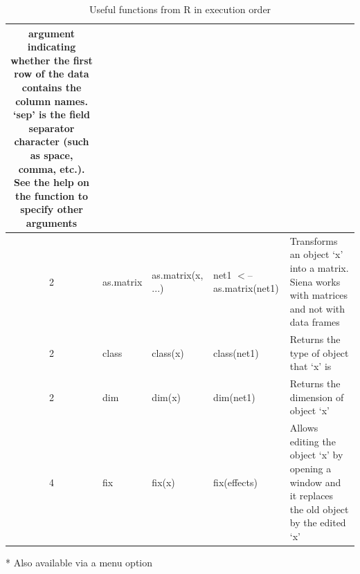 \documentclass[a4paper,fleqn,11pt]{article}
\newcommand{\+}{\, + \,}
\newcommand{\R}{{\sf R }}
\begin{document}
\begin{table}
\begin{threeparttable}
\begin{small}
\begin{tabular}{c | l | p{3cm} | p{3cm} | p{12cm} }
argument indicating whether the first row of the data contains the column
names. `sep' is the field separator character
 (such as space, comma, etc.). See the help on the function to specify
other arguments\\
\hline 2 &  as.matrix   &as.matrix(x, ...)   &net1 $<$-- \newline as.matrix(net1) &
Transforms an object `x' into a matrix. Siena works with matrices and
not with data frames\\
\hline 2&  class &   class(x)  & class(net1)  & Returns the type of object that
`x' is\\
\hline
2&   dim  & dim(x)  & dim(net1) &  Returns the dimension of object `x'\\
\hline 4 &   fix\tnote{*}  & fix(x) &  fix(effects) &  Allows editing the
object `x'
 by opening a window and it replaces the old object by the edited `x'\\
\hline
\end{tabular}
\caption[Functions from \R in order of execution] {Useful functions from \R in
execution order} \label{tab:FuncExR}
\begin{tablenotes}
\item [*] Also available via a menu option
\end{tablenotes}
\end{small}
\end{threeparttable}
\end{table}
\end{document}
